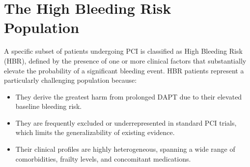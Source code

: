 \section{The High Bleeding Risk Population}

A specific subset of patients undergoing PCI is classified as High Bleeding
Risk (HBR), defined by the presence of one or more clinical factors that
substantially elevate the probability of a significant bleeding event.
HBR patients represent a particularly challenging population because:
\begin{itemize}
  \item They derive the greatest harm from prolonged DAPT due to their
    elevated baseline bleeding risk.
  \item They are frequently excluded or underrepresented in standard PCI
    trials, which limits the generalizability of existing evidence.
  \item Their clinical profiles are highly heterogeneous, spanning a wide
    range of comorbidities, frailty levels, and concomitant medications.
\end{itemize}

